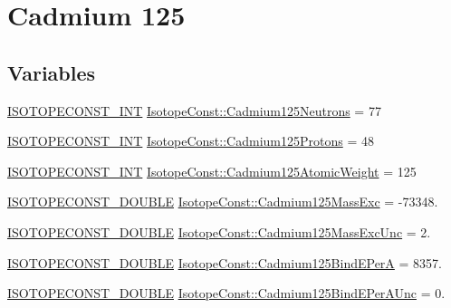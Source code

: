 \hypertarget{group___isotope_const-_cadmium-_cd125}{}\section{Cadmium 125}
\label{group___isotope_const-_cadmium-_cd125}
\subsection*{Variables}
\begin{DoxyCompactItemize}
\item 
\mbox{\hyperlink{group___isotope_const-_macros_ga5f18360b3e99483a35c32d789e62621c}{I\+S\+O\+T\+O\+P\+E\+C\+O\+N\+S\+T\+\_\+\+I\+NT}} \mbox{\hyperlink{group___isotope_const-_cadmium-_cd125_ga38312bb52a63772fd1cb6ab71267742f}{Isotope\+Const\+::\+Cadmium125\+Neutrons}} = 77
\item 
\mbox{\hyperlink{group___isotope_const-_macros_ga5f18360b3e99483a35c32d789e62621c}{I\+S\+O\+T\+O\+P\+E\+C\+O\+N\+S\+T\+\_\+\+I\+NT}} \mbox{\hyperlink{group___isotope_const-_cadmium-_cd125_ga67e45c5a64f5fc7d1597d3cdce96aa82}{Isotope\+Const\+::\+Cadmium125\+Protons}} = 48
\item 
\mbox{\hyperlink{group___isotope_const-_macros_ga5f18360b3e99483a35c32d789e62621c}{I\+S\+O\+T\+O\+P\+E\+C\+O\+N\+S\+T\+\_\+\+I\+NT}} \mbox{\hyperlink{group___isotope_const-_cadmium-_cd125_ga72ad62d4f13276f9b3f45cfdd1a6234d}{Isotope\+Const\+::\+Cadmium125\+Atomic\+Weight}} = 125
\item 
\mbox{\hyperlink{group___isotope_const-_macros_ga8f45a7272ce02c0b4c65c44636ed719a}{I\+S\+O\+T\+O\+P\+E\+C\+O\+N\+S\+T\+\_\+\+D\+O\+U\+B\+LE}} \mbox{\hyperlink{group___isotope_const-_cadmium-_cd125_ga9295fc96d1013e608b90a0f5e95d507b}{Isotope\+Const\+::\+Cadmium125\+Mass\+Exc}} = -\/73348.
\item 
\mbox{\hyperlink{group___isotope_const-_macros_ga8f45a7272ce02c0b4c65c44636ed719a}{I\+S\+O\+T\+O\+P\+E\+C\+O\+N\+S\+T\+\_\+\+D\+O\+U\+B\+LE}} \mbox{\hyperlink{group___isotope_const-_cadmium-_cd125_gac4ba0221038044f85f10a0d3f3f95cea}{Isotope\+Const\+::\+Cadmium125\+Mass\+Exc\+Unc}} = 2.
\item 
\mbox{\hyperlink{group___isotope_const-_macros_ga8f45a7272ce02c0b4c65c44636ed719a}{I\+S\+O\+T\+O\+P\+E\+C\+O\+N\+S\+T\+\_\+\+D\+O\+U\+B\+LE}} \mbox{\hyperlink{group___isotope_const-_cadmium-_cd125_ga326134db977924d3ef60aca75488aa14}{Isotope\+Const\+::\+Cadmium125\+Bind\+E\+PerA}} = 8357.
\item 
\mbox{\hyperlink{group___isotope_const-_macros_ga8f45a7272ce02c0b4c65c44636ed719a}{I\+S\+O\+T\+O\+P\+E\+C\+O\+N\+S\+T\+\_\+\+D\+O\+U\+B\+LE}} \mbox{\hyperlink{group___isotope_const-_cadmium-_cd125_ga6265aeec5332fb149f57e40111086b6b}{Isotope\+Const\+::\+Cadmium125\+Bind\+E\+Per\+A\+Unc}} = 0.

\end{DoxyCompactItemize}
